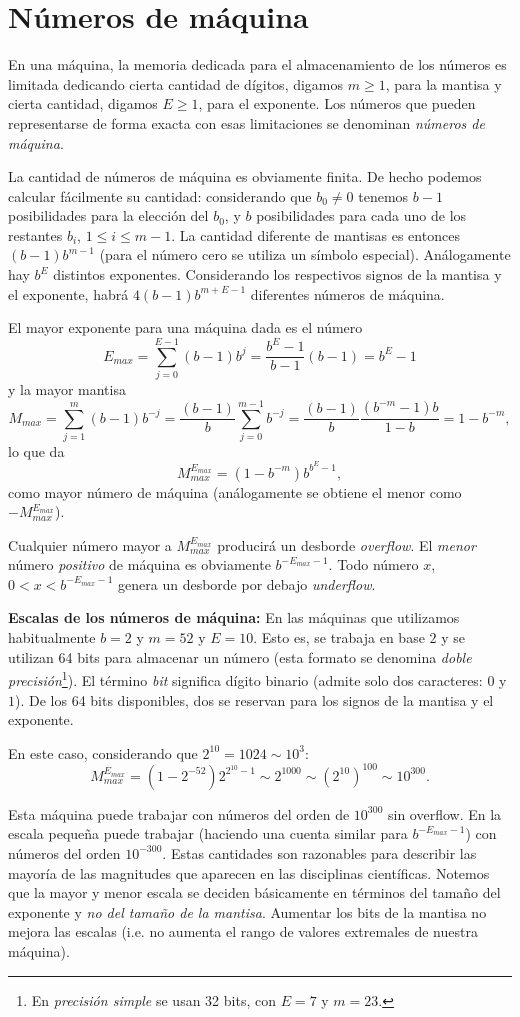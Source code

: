\section{Números de máquina}
En una máquina, la memoria dedicada para el almacenamiento de los números es limitada dedicando cierta cantidad de dígitos, digamos $m\ge 1$, para la mantisa y cierta cantidad, digamos $E\ge 1$, para el exponente. Los números que pueden representarse de forma exacta con esas limitaciones se denominan \emph{números de máquina}.

La cantidad de números de máquina es obviamente finita.  De hecho podemos calcular fácilmente su cantidad: considerando que $b_0\neq 0$ tenemos $b-1$ posibilidades para la elección del $b_0$, y $b$ posibilidades para cada uno de los restantes $b_i$, $1\le i\le m-1$. La cantidad diferente de mantisas es entonces $(b-1)b^{m-1}$ (para el número cero se utiliza un símbolo especial). Análogamente hay $b^{E}$ distintos exponentes. Considerando los respectivos signos de la mantisa y el exponente, habrá
$4(b-1)b^{m+E-1}$ diferentes números de máquina.

El mayor exponente para una máquina dada es el número
$$E_{max}=\sum_{j=0}^{E-1}(b-1)b^j=\frac{b^E-1}{b-1}(b-1)=b^E-1$$ y la mayor mantisa $$M_{max}=\sum_{j=1}^{m}(b-1)b^{-j}=\frac{(b-1)}{b}\sum_{j=0}^{m-1}b^{-j}=\frac{(b-1)}{b}\frac{(b^{-m}-1)b}{1-b}=1-b^{-m},$$ lo que da
$$
M_{max}^{E_{max}}=\left(1-b^{-m}\right)b^{b^E-1},
$$
como mayor número de máquina (análogamente se obtiene el menor como $-M_{max}^{E_{max}}$).

Cualquier número mayor a $M_{max}^{E_{max}}$ producirá  un desborde \emph{overflow}. El \emph{menor} número \emph{positivo} de máquina es obviamente $b^{-E_{max}-1}$. Todo número $x$, $0<x<b^{-E_{max}-1}$ genera un desborde por debajo \emph{underflow}.

\begin{tcolorbox}{\bf Escalas de los números de máquina:}
 En las máquinas que utilizamos habitualmente $b=2$ y $m=52$ y $E=10$. Esto es, se trabaja en base $2$ y se utilizan 64 bits para almacenar un número (esta formato se denomina \emph{doble precisión}\footnote{En \emph{precisión simple} se usan 32 bits, con $E=7$ y $m=23$.}). El término \emph{bit} significa dígito binario (admite solo dos caracteres: $0$ y $1$). De los 64 bits disponibles, dos se reservan para los signos de la mantisa y el exponente.

 En este caso, considerando que $2^{10}=1024\sim 10^3$:
$$M_{max}^{E_{max}}=(1-2^{-52})2^{2^{10}-1}\sim 2^{1000}\sim (2^{10})^{100}\sim 10^{300}.$$

Esta máquina puede trabajar con números del orden de $10^{300}$ sin overflow. En la escala pequeña puede trabajar (haciendo una cuenta similar para $b^{-E_{max}-1}$) con números del orden $10^{-300}$. Estas cantidades son razonables para describir las mayoría de las magnitudes que aparecen en las disciplinas científicas.
Notemos que la mayor y menor escala se deciden básicamente en términos del tamaño del exponente y \emph{no del tamaño de la mantisa}. Aumentar los bits de la mantisa no mejora las escalas (i.e. no aumenta el rango de valores extremales de nuestra máquina).
\end{tcolorbox}

